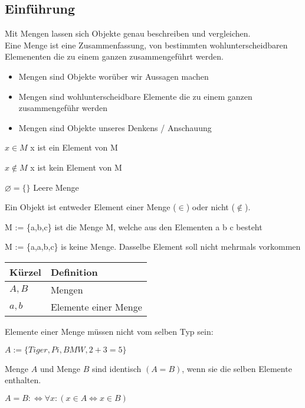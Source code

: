 \documentclass[../gruppenarbeit_1.tex]{subfiles}
\begin{document}
\def\firstcircle{(0,0) circle (1.5cm)}
\def\secondcircle{(60:2cm) circle (1.5cm)}
\def\thirdcircle{(0:2cm) circle (1.5cm)}


\subsection{Einführung}
Mit Mengen lassen sich Objekte genau beschreiben und vergleichen. \\
Eine Menge ist eine Zusammenfassung, von bestimmten wohlunterscheidbaren Elemenenten die zu einem ganzen zusammengeführt werden.\\

\begin{itemize}
    \item Mengen sind Objekte worüber wir Aussagen machen
    \item Mengen sind wohlunterscheidbare Elemente die zu einem ganzen zusammengeführ werden
    \item Mengen sind Objekte unseres Denkens / Anschauung
\end{itemize}

$x \in M$
x ist ein Element von M

$x \notin M$
x ist kein Element von M

$\varnothing = \{\}$
Leere Menge

Ein Objekt ist entweder Element einer Menge ($\in$) oder nicht ($\notin$).

M := \{a,b,c\}
ist die Menge M, welche aus den Elementen a b c besteht

M := \{a,a,b,c\}
is keine Menge. Dasselbe Element soll nicht mehrmals vorkommen

\def\arraystretch{1.5}
\begin{table}[ht]
\begin{tabular}[t]{ll}
\hline
  Kürzel & Definition\\
\hline
  $A, B$ & Mengen\\
  $a, b$ & Elemente einer Menge\\
\hline
\end{tabular}
\end{table}

Elemente einer Menge müssen nicht vom selben Typ sein:

$A := \{Tiger, Pi, BMW, 2+3=5\}$

Menge $A$ und Menge $B$ sind identisch $(A=B)$, wenn sie die selben Elemente enthalten.

$A=B : \iff \forall x : (x \in A \iff x \in B)$
\end{document}
